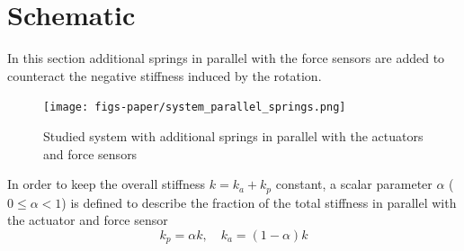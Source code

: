\documentclass[a4paper, 10pt, DIV=12, parskip=full]{scrreprt}
\begin{document}
\section{Schematic}
\label{sec:orgc647af5}
In this section additional springs in parallel with the force sensors are added to counteract the negative stiffness induced by the rotation.

\begin{figure}[htbp]
\centering
\texttt{[image: figs-paper/system\_parallel\_springs.png]}
\caption{\label{fig:system_parallel_springs}Studied system with additional springs in parallel with the actuators and force sensors}
\end{figure}

In order to keep the overall stiffness \(k = k_a + k_p\) constant, a scalar parameter \(\alpha\) (\(0 \le \alpha < 1\)) is defined to describe the fraction of the total stiffness in parallel with the actuator and force sensor
\begin{equation}
  k_p = \alpha k, \quad k_a = (1 - \alpha) k
\end{equation}
\end{document}
